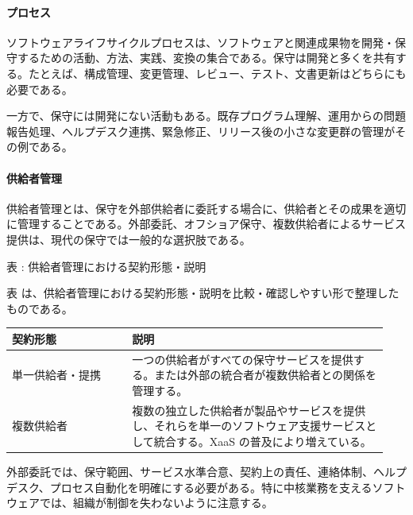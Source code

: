 \paragraph{プロセス}
ソフトウェアライフサイクルプロセスは、ソフトウェアと関連成果物を開発・保守するための活動、方法、実践、変換の集合である。保守は開発と多くを共有する。たとえば、構成管理、変更管理、レビュー、テスト、文書更新はどちらにも必要である。\par
一方で、保守には開発にない活動もある。既存プログラム理解、運用からの問題報告処理、ヘルプデスク連携、緊急修正、リリース後の小さな変更群の管理がその例である。\par
\paragraph{供給者管理}
供給者管理とは、保守を外部供給者に委託する場合に、供給者とその成果を適切に管理することである。外部委託、オフショア保守、複数供給者によるサービス提供は、現代の保守では一般的な選択肢である。\par
\par\smallskip\noindent{}\label{tab:ch07-05}表 \thetable: 供給者管理における契約形態・説明\par\smallskip
表 \thetable は、供給者管理における契約形態・説明を比較・確認しやすい形で整理したものである。\par\smallskip
\begin{longtable}{p{0.30\linewidth}p{0.64\linewidth}}
\toprule
契約形態 & 説明 \\
\midrule
\endhead
単一供給者・提携 & 一つの供給者がすべての保守サービスを提供する。または外部の統合者が複数供給者との関係を管理する。 \\
複数供給者 & 複数の独立した供給者が製品やサービスを提供し、それらを単一のソフトウェア支援サービスとして統合する。XaaS の普及により増えている。 \\
\bottomrule
\end{longtable}
外部委託では、保守範囲、サービス水準合意、契約上の責任、連絡体制、ヘルプデスク、プロセス自動化を明確にする必要がある。特に中核業務を支えるソフトウェアでは、組織が制御を失わないように注意する。\par
